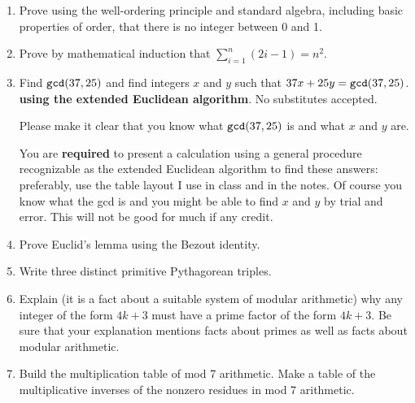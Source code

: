 \documentclass[12pt]{article}
\begin{document}
\begin{enumerate}

\item  

Prove using the well-ordering principle and standard algebra, including basic properties of order, that
there is no integer between 0 and 1.



\newpage

\item

Prove by mathematical induction that $\sum_{i=1}^n (2i-1) = n^2$.


\newpage

\item

Find ${\tt gcd}(37,25)$ and find integers $x$ and $y$ such that $37x+25y = {\tt gcd}(37,25)$. {\bf using the extended Euclidean algorithm}.  No substitutes accepted.

Please make it clear that you know what ${\tt gcd}(37,25)$  is and what $x$ and $y$ are.

You are {\bf required} to present a calculation using a general procedure recognizable as the extended Euclidean algorithm to find these answers:  preferably, use the table layout I use in class and in the notes.  Of course you know what the gcd is and you might be able to find $x$ and $y$ by trial and error.  This will not be good for much if any credit.


\newpage

\item  Prove Euclid's lemma using the Bezout identity.



\newpage

\item   Write three distinct primitive Pythagorean triples.


\newpage

\item  Explain (it is a fact about a suitable system of modular arithmetic) why any integer of the form $4k+3$ must have a prime factor of the form $4k+3$.  Be sure that your explanation mentions facts about primes as well as facts about modular arithmetic.


\newpage

\item   Build the multiplication table of mod 7 arithmetic.  Make a table of the multiplicative inverses of the nonzero residues in mod 7 arithmetic.




\end{enumerate}
\end{document}
